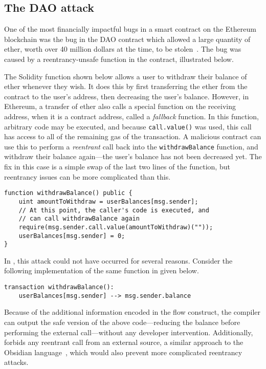\documentclass[dvipsnames, usenames, sigconf]{acmart}
\begin{document}
\subsection{The DAO attack}\label{sec:ex-dao-attack}
One of the most financially impactful bugs in a smart contract on the Ethereum blockchain was the bug in the DAO contract which allowed a large quantity of ether, worth over 40 million dollars at the time, to be stolen~\cite{OlivaEtAl2019}.
The bug was caused by a reentrancy-unsafe function in the contract, illustrated below.

The Solidity function shown below allows a user to withdraw their balance of ether whenever they wish.
It does this by first transferring the ether from the contract to the user's address, then decreasing the user's balance.
However, in Ethereum, a transfer of ether also calls a special function on the receiving address, when it is a contract address, called a \emph{fallback} function.
In this function, arbitrary code may be executed, and because \lstinline{call.value()} was used, this call has access to all of the remaining gas of the transaction.
A malicious contract can use this to perform a \emph{reentrant} call back into the \lstinline{withdrawBalance} function, and withdraw their balance again---the user's balance has not been decreased yet.
The fix in this case is a simple swap of the last two lines of the function, but reentrancy issues can be more complicated than this.
\begin{lstlisting}[language=Solidity]
function withdrawBalance() public {
    uint amountToWithdraw = userBalances[msg.sender];
    // At this point, the caller's code is executed, and
    // can call withdrawBalance again
    require(msg.sender.call.value(amountToWithdraw)(""));
    userBalances[msg.sender] = 0;
}
\end{lstlisting}

In \langName, this attack could not have occurred for several reasons.
Consider the following implementation of the same function in \langName given below.
\begin{lstlisting}[language=flow]
transaction withdrawBalance():
    userBalances[msg.sender] --> msg.sender.balance
\end{lstlisting}
Because of the additional information encoded in the flow construct, the compiler can output the safe version of the above code---reducing the balance before performing the external call---without any developer intervention.
Additionally, \langName forbids any reentrant call from an external source, a similar approach to the Obsidian language~\cite{coblenz2019obsidian}, which would also prevent more complicated reentrancy attacks.
\end{document}

